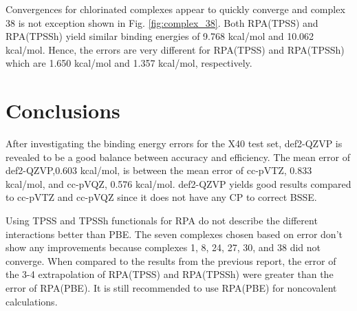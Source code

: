 \documentclass[11pt]{article}
\begin{document}
Convergences for chlorinated complexes appear to quickly converge and
complex 38 is not exception shown in Fig. \ref{fig:complex_38}. Both
RPA(TPSS) and RPA(TPSSh) yield similar binding energies of 9.768 kcal/mol
and 10.062 kcal/mol. Hence, the errors are very different for RPA(TPSS)
and RPA(TPSSh) which are 1.650 kcal/mol and 1.357 kcal/mol, respectively.

\section{Conclusions}

After investigating the binding energy errors for the X40 test set,
def2-QZVP is revealed to be a good balance between accuracy and
efficiency. The mean error of def2-QZVP,0.603 kcal/mol, is between the
mean error of cc-pVTZ, 0.833 kcal/mol, and cc-pVQZ, 0.576 kcal/mol.
def2-QZVP yields good results compared to cc-pVTZ and cc-pVQZ since it
does not have any CP to correct BSSE.

Using TPSS and TPSSh functionals for RPA do not describe the different
interactions better than PBE. The seven complexes chosen based on error
don't show any improvements because complexes 1, 8, 24, 27, 30, and 38
did not converge. When compared to the results from the previous report,
the error of the 3-4 extrapolation of RPA(TPSS) and RPA(TPSSh) were
greater than the error of RPA(PBE). It is still recommended to use
RPA(PBE) for noncovalent calculations.


\printbibliography
\end{document}
